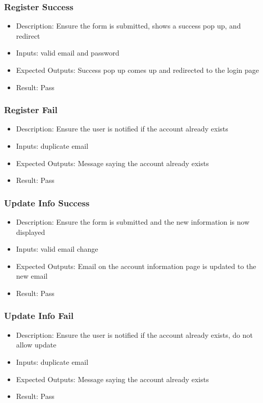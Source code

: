 \documentclass[12pt, titlepage]{article}
\begin{document}
\subsubsection{Register Success}
\begin{itemize}
    \item Description: Ensure the form is submitted, shows a success pop up, and redirect
    \item Inputs: valid email and password
    \item Expected Outputs: Success pop up comes up and redirected to the login page
    \item Result: Pass
\end{itemize}
\subsubsection{Register Fail}
\begin{itemize}
    \item Description: Ensure the user is notified if the account already exists
    \item Inputs: duplicate email
    \item Expected Outputs: Message saying the account already exists
    \item Result: Pass
\end{itemize}
\subsubsection{Update Info Success}
\begin{itemize}
    \item Description: Ensure the form is submitted and the new information is now displayed
    \item Inputs: valid email change
    \item Expected Outputs: Email on the account information page is updated to the new email
    \item Result: Pass
\end{itemize}
\subsubsection{Update Info Fail}
\begin{itemize}
    \item Description: Ensure the user is notified if the account already exists, do not allow update
    \item Inputs: duplicate email
    \item Expected Outputs: Message saying the account already exists
    \item Result: Pass
\end{itemize}
\end{document}

